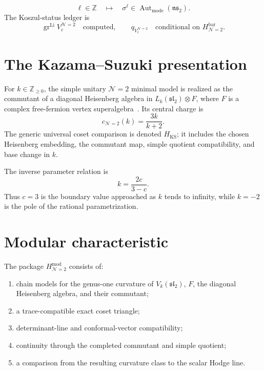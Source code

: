 \begin{equation}\label{eq:n2-ledger-spectral-flow}
 \ell\in\mathbb Z
 \quad\longmapsto\quad
 \sigma^\ell\in\operatorname{Aut}_{\mathrm{mode}}(\mathfrak{ns}_2).
\end{equation}
The Koszul-status ledger is
\begin{equation}\label{eq:n2-ledger-koszul-status}
 \operatorname{gr}^{\mathrm{Li}}V_c^{\mathcal N=2}
 \quad\text{computed},\qquad
 q_{V_c^{\mathcal N=2}}\quad\text{conditional on }
 H_{\mathcal N=2}^{\mathrm{bar}}.
\end{equation}

\section{The Kazama--Suzuki presentation}

\begin{remark}
\label{rem:n2-kazama-suzuki}
For $k\in\mathbb Z_{\ge0}$, the simple unitary $\mathcal N=2$ minimal
model is realized as the commutant of a diagonal Heisenberg algebra in
$L_k(\mathfrak{sl}_2)\otimes F$, where $F$ is a complex free-fermion
vertex superalgebra~\cite{KazamaSuzuki1989}.  Its central charge is
\begin{equation}\label{eq:n2-coset}
 c_{\mathcal N=2}(k)=\frac{3k}{k+2}.
\end{equation}
The generic universal coset comparison is denoted $H_{\mathrm{KS}}$;
it includes the chosen Heisenberg embedding, the commutant map, simple
quotient compatibility, and base change in $k$.
\end{remark}

The inverse parameter relation is
\[
 k=\frac{2c}{3-c}.
\]
Thus $c=3$ is the boundary value approached as $k$ tends to infinity,
while $k=-2$ is the pole of the rational parametrization.

\section{Modular characteristic}

\begin{definition}
\label{def:n2-modular-comparison-package}
The package $H_{\mathcal N=2}^{\mathrm{mod}}$ consists of:
\begin{enumerate}[label=\textup{(\roman*)}]
\item chain models for the genus-one curvature of
 $V_k(\mathfrak{sl}_2)$, $F$, the diagonal Heisenberg algebra, and
 their commutant;
\item a trace-compatible exact coset triangle;
\item determinant-line and conformal-vector compatibility;
\item continuity through the completed commutant and simple quotient;
\item a comparison from the resulting curvature class to the scalar
 Hodge line.
\end{enumerate}
\end{definition}

